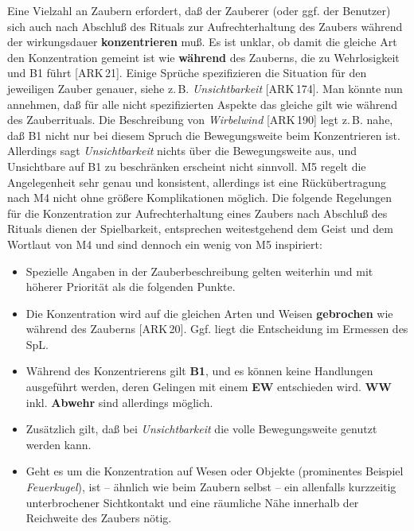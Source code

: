 \documentclass[10pt,a4paper,germanpar]{article}
\begin{document}
Eine Vielzahl an Zaubern erfordert, daß der Zauberer (oder ggf. der
Benutzer) sich auch nach Abschluß des Rituals zur Aufrechterhaltung
des Zaubers während der wirkungsdauer \textbf{konzentrieren} muß. Es
ist unklar, ob damit die gleiche Art den Konzentration gemeint ist wie
\textbf{während} des Zauberns, die zu Wehrlosigkeit und B1 führt
[ARK\,21]. Einige Sprüche spezifizieren die Situation für den
jeweiligen Zauber genauer, siehe z.\,B. \emph{Unsichtbarkeit}
[ARK\,174]. Man könnte nun annehmen, daß für alle nicht spezifizierten
Aspekte das gleiche gilt wie während des Zauberrituals. Die
Beschreibung von \emph{Wirbelwind} [ARK\,190] legt z.\,B. nahe, daß B1
nicht nur bei diesem Spruch die Bewegungsweite beim Konzentrieren
ist. Allerdings sagt \emph{Unsichtbarkeit} nichts über die
Bewegungsweite aus, und Unsichtbare auf B1 zu beschränken erscheint
nicht sinnvoll. M5 regelt die Angelegenheit sehr genau und konsistent,
allerdings ist eine Rückübertragung nach M4 nicht ohne größere
Komplikationen möglich. Die folgende Regelungen für die Konzentration
zur Aufrechterhaltung eines Zaubers nach Abschluß des Rituals dienen
der Spielbarkeit, entsprechen weitestgehend dem Geist und dem Wortlaut
von M4 und sind dennoch ein wenig von M5 inspiriert:

\begin{itemize}
\item Spezielle Angaben in der Zauberbeschreibung gelten
  weiterhin und mit höherer Priorität als die folgenden Punkte.
\item Die Konzentration wird auf die gleichen Arten und Weisen
  \textbf{gebrochen} wie während des Zauberns [ARK\,20]. Ggf. liegt
  die Entscheidung im Ermessen des SpL.
\item Während des Konzentrierens gilt \textbf{B1}, und es können keine
  Handlungen ausgeführt werden, deren Gelingen mit einem \textbf{EW}
  entschieden wird. \textbf{WW} inkl. \textbf{Abwehr} sind allerdings
  möglich.
\item Zusätzlich gilt, daß bei \emph{Unsichtbarkeit} die volle
  Bewegungsweite genutzt werden kann.
\item Geht es um die Konzentration auf Wesen oder Objekte (prominentes
  Beispiel \emph{Feuerkugel}), ist -- ähnlich wie beim Zaubern selbst
  -- ein allenfalls kurzzeitig unterbrochener Sichtkontakt und eine
  räumliche Nähe innerhalb der Reichweite des Zaubers nötig.
\end{itemize}
\end{document}
